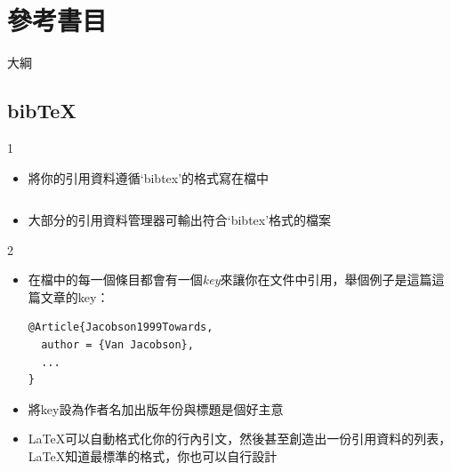 \documentclass{beamer}
\begin{document}
\section{參考書目}

\begin{frame}{大綱}
\begin{multicols}{2}
\tableofcontents[currentsection]
\end{multicols}
\end{frame}

\subsection{bib\TeX}
\begin{frame}[fragile]{\insertsubsection{} 1}
\begin{itemize}
\item 將你的引用資料遵循`bibtex'的格式寫在檔中
\inputminted[fontsize=\scriptsize,frame=single]{latex}{bib-example.bib}
\item 大部分的引用資料管理器可輸出符合`bibtex'格式的檔案
\end{itemize}
\end{frame}

\begin{frame}[fragile]{\insertsubsection{} 2}
\begin{itemize}
\item 在檔中的每一個條目都會有一個\emph{key}來讓你在文件中引用，舉個例子是這篇這篇文章的key：
\begin{verbatim}
@Article{Jacobson1999Towards,
  author = {Van Jacobson},
  ...
}
\end{verbatim}
\item 將key設為作者名加出版年份與標題是個好主意
\item \LaTeX{}可以自動格式化你的行內引文，然後甚至創造出一份引用資料的列表，\LaTeX{}知道最標準的格式，你也可以自行設計
\end{itemize}
\end{frame}
\end{document}

